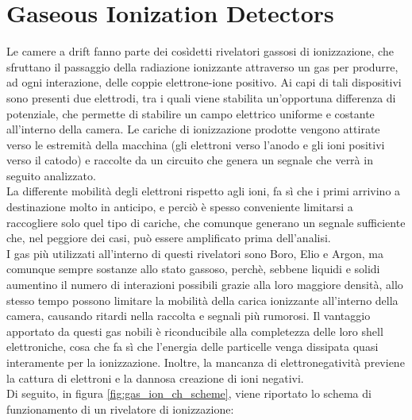 \documentclass[a4paper,11pt]{book}
\begin{document}
\section{Gaseous Ionization Detectors}
Le camere a drift fanno parte dei cosìdetti rivelatori gassosi di ionizzazione, che sfruttano il passaggio della radiazione ionizzante attraverso un gas per produrre, ad ogni interazione, delle coppie elettrone-ione positivo. Ai capi di tali dispositivi sono presenti due elettrodi, tra i quali viene stabilita un'opportuna differenza di potenziale, che permette di stabilire un campo elettrico uniforme e costante all'interno della camera. Le cariche di ionizzazione prodotte vengono attirate verso le estremità della macchina (gli elettroni verso l'anodo e gli ioni positivi verso il catodo) e raccolte da un circuito che genera un segnale che verrà in seguito analizzato.\\
La differente mobilità degli elettroni rispetto agli ioni, fa sì che i primi arrivino a destinazione molto in anticipo, e perciò è spesso conveniente limitarsi a raccogliere solo quel tipo di cariche, che comunque generano un segnale sufficiente che, nel peggiore dei casi, può essere amplificato prima dell'analisi.\\
I gas più utilizzati all'interno di questi rivelatori sono Boro, Elio e Argon, ma comunque sempre sostanze allo stato gassoso, perchè, sebbene liquidi e solidi aumentino il numero di interazioni possibili grazie alla loro maggiore densità, allo stesso tempo possono limitare la mobilità della carica ionizzante all'interno della camera, causando ritardi nella raccolta e segnali più rumorosi. Il vantaggio apportato da questi gas nobili è riconducibile alla completezza delle loro shell elettroniche, cosa che fa sì che l'energia delle particelle venga dissipata quasi interamente per la ionizzazione. Inoltre, la mancanza di elettronegatività previene la cattura di elettroni e la dannosa creazione di ioni negativi.\\

Di seguito, in figura \ref{fig:gas_ion_ch_scheme}, viene riportato lo schema di funzionamento di un rivelatore di ionizzazione:
\end{document}
